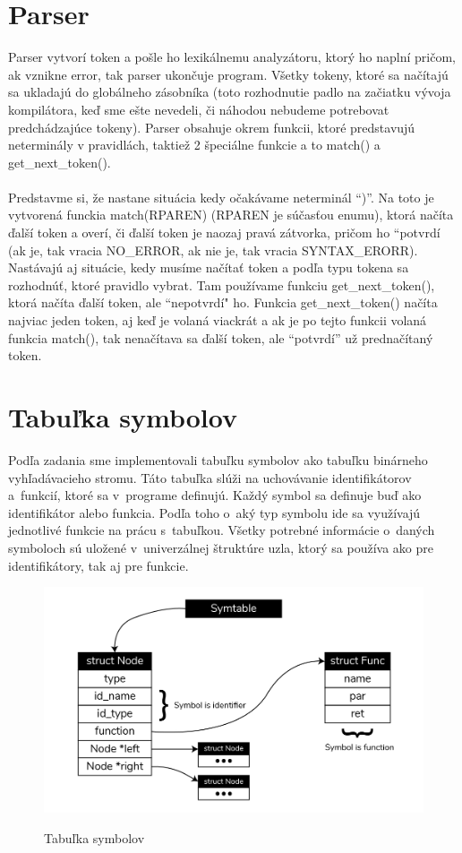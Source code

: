 \documentclass[a4paper,11pt]{article}
\begin{document}
	\section{Parser}\label{sec:parser}

		Parser vytvorí token a pošle ho lexikálnemu analyzátoru, ktorý ho naplní pričom, ak vznikne error, tak parser ukončuje program. Všetky tokeny, ktoré sa načítajú sa ukladajú do globálneho zásobníka (toto rozhodnutie padlo na začiatku vývoja kompilátora, keď sme ešte nevedeli, či náhodou nebudeme potrebovat predchádzajúce tokeny). Parser obsahuje okrem funkcii, ktoré predstavujú neterminály v pravidlách, taktiež 2 špeciálne funkcie a to match() a get\_next\_token(). \\ \\
		Predstavme si, že nastane situácia kedy očakávame neterminál “)”. Na toto je vytvorená funckia match(RPAREN) (RPAREN je súčasťou enumu), ktorá načíta ďalší token a overí, či ďalší token je naozaj pravá zátvorka, pričom ho “potvrdí (ak je, tak vracia NO\_ERROR, ak nie je, tak vracia SYNTAX\_ERORR). Nastávajú aj situácie, kedy musíme načítať token a podľa typu tokena sa rozhodnúť, ktoré pravidlo vybrat. Tam používame funkciu get\_next\_token(), ktorá načíta ďalší token, ale “nepotvrdí" ho.  Funkcia get\_next\_token() načíta najviac jeden token, aj keď je volaná viackrát a ak je po tejto funkcii volaná funkcia match(), tak nenačítava sa ďalší token, ale “potvrdí” už prednačítaný token. \\
	
	\section{Tabuľka symbolov}\label{sec:tabulka}

		Podľa zadania sme implementovali tabuľku symbolov ako tabuľku binárneho vyhľadávacieho stromu. Táto tabuľka slúži na uchovávanie identifikátorov a~funkcií, ktoré sa v~programe definujú. Každý symbol sa definuje buď ako identifikátor alebo funkcia. Podľa toho o~aký typ symbolu ide sa využívajú jednotlivé funkcie na prácu s~tabuľkou. Všetky potrebné informácie o~daných symboloch sú uložené v~univerzálnej štruktúre uzla, ktorý sa používa ako pre identifikátory, tak aj pre funkcie.\\

		\begin{figure}[h]
			\centering
			\includegraphics[width = 12cm]{Symtable.jpg}\\
			\caption{Tabuľka symbolov}
			\label{fig:symtable}
		\end{figure}
\end{document}
